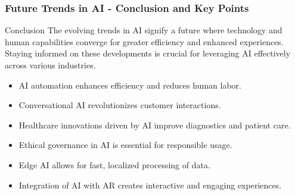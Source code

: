 \documentclass{beamer}
\begin{document}
\begin{frame}[fragile]
    \frametitle{Future Trends in AI - Conclusion and Key Points}
    \begin{block}{Conclusion}
        The evolving trends in AI signify a future where technology and human capabilities converge for greater efficiency and enhanced experiences. Staying informed on these developments is crucial for leveraging AI effectively across various industries.
    \end{block}

    \begin{itemize}
        \item AI automation enhances efficiency and reduces human labor.
        \item Conversational AI revolutionizes customer interactions.
        \item Healthcare innovations driven by AI improve diagnostics and patient care.
        \item Ethical governance in AI is essential for responsible usage.
        \item Edge AI allows for fast, localized processing of data.
        \item Integration of AI with AR creates interactive and engaging experiences.
    \end{itemize}
\end{frame}
\end{document}
